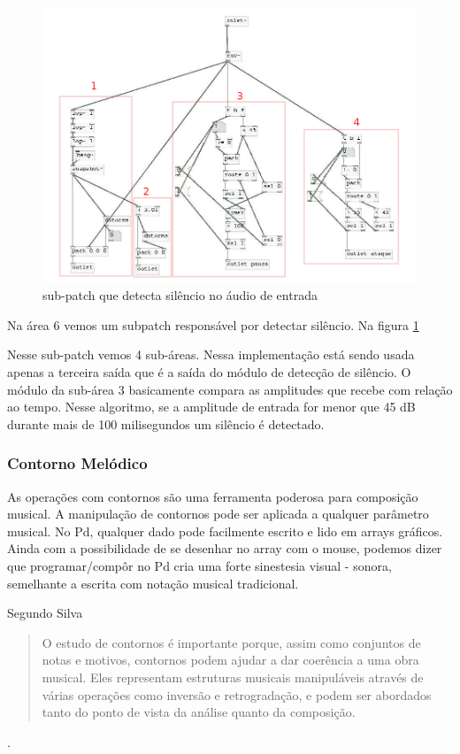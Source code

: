 \documentclass[draft]{ppgmus}
\begin{document}
\begin{figure}
\includegraphics[scale=.5]{sinc-audioanalise-detecta}
\caption{sub-patch que detecta silêncio no áudio de entrada}
\label{[sinc-audioanalise-detecta]}
\end{figure}




Na área 6 vemos um subpatch responsável por detectar
silêncio. Na figura \ref{[sinc-audioanalise-detecta]}


Nesse sub-patch vemos 4 sub-áreas. Nessa implementação
está sendo usada apenas a terceira saída que é a saída do
módulo de detecção de silêncio. O módulo da sub-área 3
basicamente compara as amplitudes que recebe com relação ao tempo.
Nesse algoritmo, se a amplitude de entrada for menor que 45 dB durante
mais de 100 milisegundos um silêncio é detectado.

\subsubsection{Contorno Melódico}
\label{contornos}


As operações com contornos são uma ferramenta poderosa para
composição musical\cite{sampaio08:torno}. A manipulação de contornos
pode ser aplicada a qualquer parâmetro musical.
No Pd, qualquer dado pode facilmente escrito e lido em arrays gráficos.
Ainda com a possibilidade de se desenhar no array com o mouse, podemos
dizer que programar/compôr no Pd cria uma
forte sinestesia visual - sonora, semelhante a escrita
com notação musical tradicional.

Segundo Silva \begin{quote}
               O estudo de contornos é importante porque, assim como conjuntos de notas e motivos,
               contornos podem ajudar a dar coerência a uma obra musical. Eles representam estruturas
		musicais manipuláveis através de várias operações como inversão e retrogradação, e podem
		ser abordados tanto do ponto de vista da análise quanto da composição.
              \end{quote} \cite{sampaio08:torno}.
\end{document}
